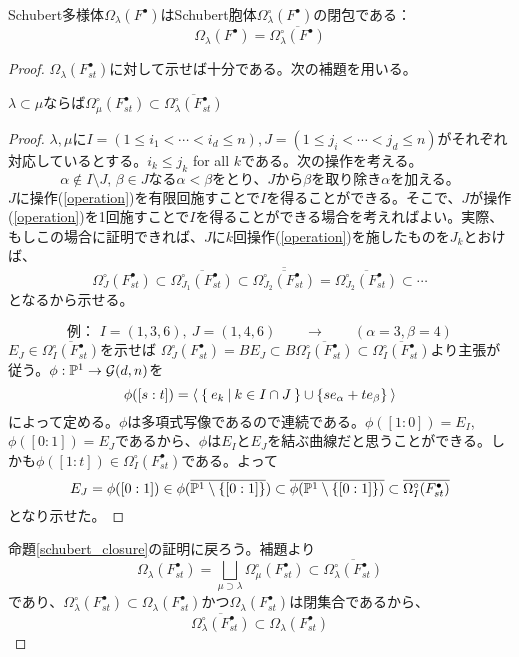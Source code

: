 \documentclass{ltjsreport}
\begin{document}
\begin{prop}\label{schubert_closure}
  Schubert多様体$\Omega_{\lambda}(F^\bullet)$はSchubert胞体$\Omega_{\lambda}^\circ(F^\bullet)$の閉包である：
  \[
    \Omega_{\lambda}(F^\bullet)=\overline{\Omega_{\lambda}^\circ(F^\bullet)}
  \]
\end{prop}

\begin{proof}
  $\Omega_{\lambda}(F^{\bullet}_{st})$に対して示せば十分である。次の補題を用いる。
  \begin{lemm}
    $\lambda\subset\mu$ならば$\Omega_{\mu}^\circ(F^\bullet_{st})\subset\overline{\Omega_{\lambda}^\circ(F^\bullet_{st})}$
  \end{lemm}

  \begin{proof}
    $\lambda,\mu$に$I=(1\leq i_1<\cdots< i_d\leq n),J=(1\leq j_i<\cdots<j_d\leq n)$がそれぞれ対応しているとする。$i_k\leq j_k$ for all $k$である。次の操作を考える。
    \begin{equation}\label{operation}
    \text{$\alpha\notin I\setminus J$, $\beta\in J$なる$\alpha <\beta$をとり、$J$から$\beta$を取り除き$\alpha$を加える。}
    \end{equation}
    $J$に操作(\ref{operation})を有限回施すことで$I$を得ることができる。そこで、$J$が操作(\ref{operation})を1回施すことで$I$を得ることができる場合を考えればよい。実際、もしこの場合に証明できれば、$J$に$k$回操作(\ref{operation})を施したものを$J_k$とおけば、
    \[
    \Omega_{J}^\circ(F^\bullet_{st})
    \subset\overline{\Omega_{J_1}^\circ(F^\bullet_{st})}\subset\overline{\overline{\Omega_{J_2}^\circ(F^\bullet_{st})}}=\overline{\Omega_{J_2}^\circ(F^\bullet_{st})}  
    \subset\cdots
    \]
    となるから示せる。

    \[
    \text{例： }I=(1,3,6),\: J=(1,4,6)\qquad\rightarrow\qquad (\alpha=3,\beta=4)
    \]
    $E_J\in \overline{\Omega_{I}^\circ(F^\bullet_{st})}$を示せば
    $\Omega_{J}^\circ(F^\bullet_{st})
    =BE_J\subset B\overline{\Omega_{I}^\circ(F^\bullet_{st})}\subset \overline{\Omega_{I}^\circ(F^\bullet_{st})}$より主張が従う。$\phi:\mathbb{P}^1\rightarrow \mathcal{G}(d,n)$を
    \[
    \phi([s:t])=\langle\:\left\{\:e_k\:\middle|\:k\in I\cap J\:\right\}\cup\{se_{\alpha}+te_{\beta}\}\:\rangle  
    \]
    によって定める。$\phi$は多項式写像であるので連続である。$\phi([1:0])=E_I$, $\phi([0:1])=E_J$であるから、$\phi$は$E_I$と$E_J$を結ぶ曲線だと思うことができる。しかも$\phi([1:t])\in \Omega_{I}^\circ(F^\bullet_{st})$である。よって
    \[
    E_J=\phi([0:1])\in\phi(\overline{\mathbb{P}^1\setminus\{[0:1]\}})
    \subset\overline{\phi(\mathbb{P}^1\setminus\{[0:1]\})}\subset\overline{\Omega_{I}^\circ(F^\bullet_{st})}
    \]
    となり示せた。
  \end{proof}

  命題\ref{schubert_closure}の証明に戻ろう。補題より
  \[
  \Omega_{\lambda}(F^\bullet_{st})
  =\bigsqcup_{\mu\supset\lambda}\Omega_{\mu}^\circ(F^\bullet_{st})  
  \subset
  \overline{\Omega_{\lambda}^\circ(F^\bullet_{st})}
  \]
  であり、$\Omega_{\lambda}^\circ(F^\bullet_{st})\subset\Omega_{\lambda}(F^\bullet_{st})$かつ$\Omega_{\lambda}(F^\bullet_{st})$は閉集合であるから、
  \[
    \overline{\Omega_{\lambda}^\circ(F^\bullet_{st})}\subset\Omega_{\lambda}(F^\bullet_{st})  
  \]
\end{proof}
\end{document}
